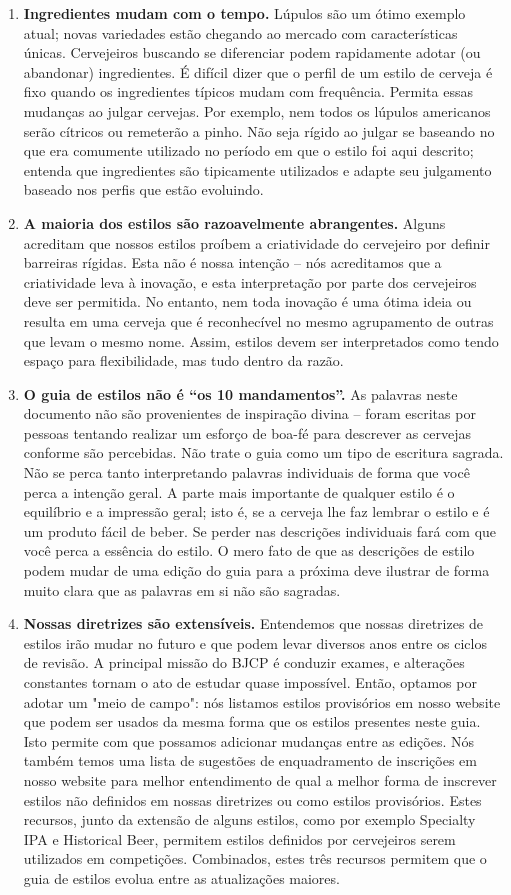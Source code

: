 \begin{enumerate}
\item \textbf{Ingredientes mudam com o tempo.} Lúpulos são um ótimo exemplo atual; novas variedades estão chegando ao mercado com características únicas. Cervejeiros buscando se diferenciar podem rapidamente adotar (ou abandonar) ingredientes. É difícil dizer que o perfil de um estilo de cerveja é fixo quando os ingredientes típicos mudam com frequência. Permita essas mudanças ao julgar cervejas. Por exemplo, nem todos os lúpulos americanos serão cítricos ou remeterão a pinho. Não seja rígido ao julgar se baseando no que era comumente utilizado no período em que o estilo foi aqui descrito; entenda que ingredientes são tipicamente utilizados e adapte seu julgamento baseado nos perfis que estão evoluindo.
\item \textbf{A maioria dos estilos são razoavelmente abrangentes.} Alguns acreditam que nossos estilos proíbem a criatividade do cervejeiro por definir barreiras rígidas. Esta não é nossa intenção – nós acreditamos que a criatividade leva à inovação, e esta interpretação por parte dos cervejeiros deve ser permitida. No entanto, nem toda inovação é uma ótima ideia ou resulta em uma cerveja que é reconhecível no mesmo agrupamento de outras que levam o mesmo nome. Assim, estilos devem ser interpretados como tendo espaço para flexibilidade, mas tudo dentro da razão.
\item \textbf{O guia de estilos não é “os 10 mandamentos”.} As palavras neste documento não são provenientes de inspiração divina – foram escritas por pessoas tentando realizar um esforço de boa-fé para descrever as cervejas conforme são percebidas. Não trate o guia como um tipo de escritura sagrada. Não se perca tanto interpretando palavras individuais de forma que você perca a intenção geral. A parte mais importante de qualquer estilo é o equilíbrio e a impressão geral; isto é, se a cerveja lhe faz lembrar o estilo e é um produto fácil de beber. Se perder nas descrições individuais fará com que você perca a essência do estilo. O mero fato de que as descrições de estilo podem mudar de uma edição do guia para a próxima deve ilustrar de forma muito clara que as palavras em si não são sagradas.
\item \textbf{Nossas diretrizes são extensíveis.} Entendemos que nossas diretrizes de estilos irão mudar no futuro e que podem levar diversos anos entre os ciclos de revisão. A principal missão do BJCP é conduzir exames, e alterações constantes tornam o ato de estudar quase impossível. Então, optamos por adotar um "meio de campo": nós listamos estilos provisórios em nosso website que podem ser usados da mesma forma que os estilos presentes neste guia. Isto permite com que possamos adicionar mudanças entre as edições. Nós também temos uma lista de sugestões de enquadramento de inscrições em nosso website para melhor entendimento de qual a melhor forma de inscrever estilos não definidos em nossas diretrizes ou como estilos provisórios. Estes recursos, junto da extensão de alguns estilos, como por exemplo Specialty IPA e Historical Beer, permitem estilos definidos por cervejeiros serem utilizados em competições. Combinados, estes três recursos permitem que o guia de estilos evolua entre as atualizações maiores.

\end{enumerate}
